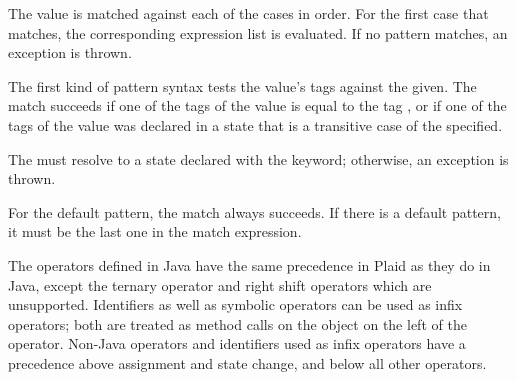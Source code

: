 \begin{quote}


 {}  

 {} 


 {}





 {} 

\end{quote}

The value is matched against each of the cases in order.  For the
first case that matches, the corresponding expression list is
evaluated.  If no pattern matches, an exception is
thrown.

The first kind of pattern syntax tests the value's tags against
the  given.  The match succeeds if
one of the tags of the value is equal to the tag
, or if one of the tags of the value
was declared in a state that is a transitive case of the
 specified.

The 
must resolve to a state declared with the 
keyword; otherwise, an exception is
thrown. 

For the default pattern, the match always succeeds.  If
there is a default pattern, it must be the last one in the match
expression.

\begin{quote}


 {}

 {}

 {}  



 {} \alt {}



 {} 

\end{quote}

The operators defined in Java have the same precedence in Plaid as
they do in Java, except the ternary operator and right shift operators 
which are unsupported.  Identifiers as well as symbolic operators can be
used as infix operators; both are treated as method calls on the
object on the left of the operator.  Non-Java operators and
identifiers used as infix operators have a precedence above assignment
and state change, and below all other operators.


